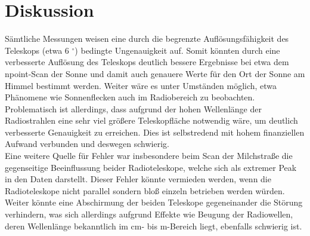 \section{Diskussion}
Sämtliche Messungen weisen eine durch die begrenzte Auflösungsfähigkeit des Teleskops (etwa 6 $^\circ$) bedingte Ungenauigkeit auf. Somit könnten durch eine verbesserte Auflösung des Teleskops deutlich bessere Ergebnisse bei etwa dem npoint-Scan der Sonne und damit auch genauere Werte für den Ort der Sonne am Himmel bestimmt werden. Weiter wäre es unter Umständen möglich, etwa Phänomene wie Sonnenflecken auch im Radiobereich zu beobachten. \\
Problematisch ist allerdings, dass aufgrund der hohen Wellenlänge der Radiostrahlen eine sehr viel größere Teleskopfläche notwendig wäre, um  deutlich verbesserte Genauigkeit zu erreichen. Dies ist selbstredend mit hohem finanziellen Aufwand verbunden und deswegen schwierig. \\
Eine weitere Quelle für Fehler war insbesondere beim Scan der Milchstraße die gegenseitige Beeinflussung beider Radioteleskope, welche sich als extremer Peak in den Daten darstellt. Dieser Fehler könnte vermieden werden, wenn die Radioteleskope nicht parallel sondern bloß einzeln betrieben werden würden. Weiter könnte eine Abschirmung der beiden Teleskope gegeneinander die Störung verhindern, was sich allerdings aufgrund Effekte wie Beugung der Radiowellen, deren Wellenlänge bekanntlich im cm- bis m-Bereich liegt, ebenfalls schwierig ist. 